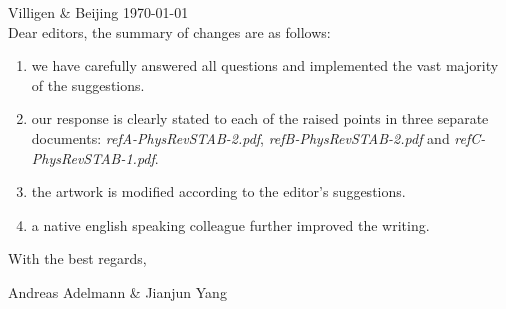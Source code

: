 \documentclass{article}
\begin{document}
Villigen \& Beijing \today \\

Dear editors, the summary of changes are as follows:

\begin{enumerate}
\item we have carefully answered all questions and implemented the vast majority of the suggestions.
\item our response is clearly stated to each of the raised points in three separate documents: {\em refA-PhysRevSTAB-2.pdf}, {\em refB-PhysRevSTAB-2.pdf} and {\em refC-PhysRevSTAB-1.pdf}.
\item the artwork is modified according to the editor's suggestions.
\item a native english speaking colleague further improved the writing.
\end{enumerate}

With the best regards,

Andreas Adelmann \& Jianjun Yang

 
\end{document}
